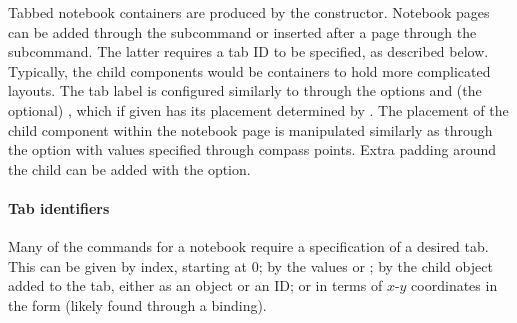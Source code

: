 Tabbed notebook containers are produced by the
 constructor.  Notebook pages can be added
through the  subcommand or inserted after
a page through the  subcommand. The
latter requires a tab ID to be specified, as described below.
Typically, the child components would be containers to hold more
complicated layouts. The tab label is configured similarly to
 through the options  and
(the optional) , which if given has its
placement determined by .  The placement
of the child component within the notebook page is manipulated
similarly as  through the
 option with values specified through
compass points. Extra padding around the child can be added with the
 option.

\paragraph{Tab identifiers} %
Many of the commands for a notebook require a specification of a
desired tab. This can be given by index, starting at 0; by the values
 or ; by the child object added to the
tab, either as an \R\/ object or an ID; or in terms of $x$-$y$
coordinates in the form  (likely found through a
binding).

